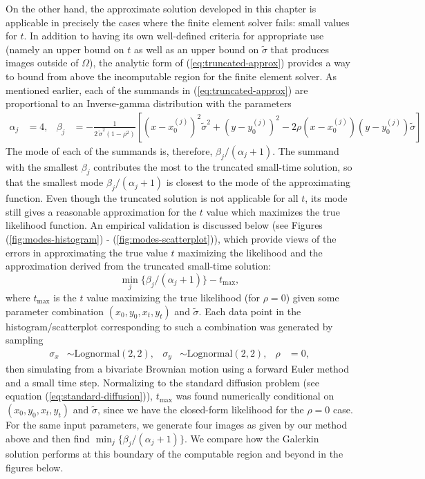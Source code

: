 On the other hand, the approximate solution developed in this chapter
is applicable in precisely the cases where the finite element solver
fails: small values for $t$. In addition to having its own
well-defined criteria for appropriate use (namely an upper bound on
$t$ as well as an upper bound on $\tilde{\sigma}$ that produces images
outside of $\Omega$), the analytic form of (\ref{eq:truncated-approx})
provides a way to bound from above the incomputable region for the
finite element solver. As mentioned earlier, each of the summands in
(\ref{eq:truncated-approx}) are proportional to an Inverse-gamma
distribution with the parameters
\begin{align*}
  \alpha_j &= 4,& \beta_j &= -\frac{1}{2\, \tilde{\sigma}^2 (1-\rho^2)} \left[
                        \left(x-x_0^{(j)}\right)^2 \tilde{\sigma}^2 +
                        \left(y-y_0^{(j)}\right)^2 -
                        2\rho(x-x_0^{(j)})(y-y_0^{(j)})\tilde{\sigma} \right]
\end{align*}
The mode of each of the summands is, therefore,
$\beta_j/(\alpha_j+1)$. The summand with the smallest $\beta_j$
contributes the most to the truncated small-time solution, so that the
smallest mode $\beta_j/(\alpha_j+1)$ is closest to the mode of
the approximating function. Even though the truncated solution is not
applicable for all $t$, its mode still gives a reasonable
approximation for the $t$ value which maximizes the true likelihood
function. An empirical validation is discussed below (see Figures
(\ref{fig:modes-histogram}) - (\ref{fig:modes-scatterplot})), which
provide views of the errors in approximating the true
value $t$ maximizing the likelihood and the approximation derived from
the truncated small-time solution:
\[
  \min_{j} \{ \beta_j/(\alpha_j+1) \} - t_{\max},
\]
where $t_{\max}$ is the $t$ value maximizing the true likelihood (for
$\rho=0$) given some parameter combination $(x_0, y_0, x_t, y_t)$ and
$\tilde{\sigma}$. Each data point in the histogram/scatterplot
corresponding to such a combination was generated by sampling
\begin{align*}
  \sigma_x &\sim \mbox{Lognormal}(2, 2), & \sigma_y &\sim \mbox{Lognormal}(2, 2), & \rho &= 0,
\end{align*}
then simulating from a bivariate Brownian motion using a forward Euler
method and a small time step. Normalizing to the standard diffusion
problem (see equation (\ref{eq:standard-diffusion})), $t_{\max}$ was
found numerically conditional on $(x_0, y_0, x_t, y_t)$ and
$\tilde{\sigma}$, since we have the closed-form likelihood for the
$\rho=0$ case. For the same input parameters, we generate four images
as given by our method above and then find
$\min_{j} \{ \beta_j/(\alpha_j+1) \}$. We compare how the
Galerkin solution performs at this boundary of the computable region
and beyond in the figures below.

